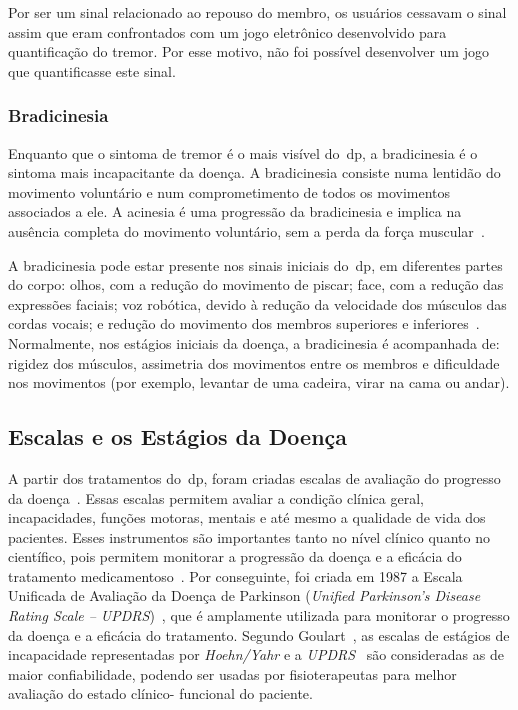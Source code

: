 Por ser um sinal relacionado ao repouso do membro, os usuários cessavam o sinal assim que eram confrontados com um jogo eletrônico desenvolvido para quantificação do tremor. Por esse motivo, não foi possível desenvolver um jogo que quantificasse este sinal.


\subsubsection{Bradicinesia}\label{section:analise_bradicinesia}
Enquanto que o sintoma de tremor é o mais visível do~\ac{dp}, a bradicinesia é o sintoma mais incapacitante da doença. A bradicinesia consiste numa lentidão do movimento voluntário e num comprometimento de todos os movimentos associados a ele. A acinesia é uma progressão da bradicinesia e implica na ausência completa do movimento voluntário, sem a perda da força muscular~\cite{do2007parkinson}.

A bradicinesia pode estar presente nos sinais iniciais do~\ac{dp}, em diferentes partes do corpo: olhos, com a redução do movimento de piscar; face, com a redução das expressões faciais; voz robótica, devido à redução da velocidade dos músculos das cordas vocais; e redução do movimento dos membros superiores e inferiores~\cite{do2007parkinson}. Normalmente, nos estágios iniciais da doença, a bradicinesia é acompanhada de: rigidez dos músculos, assimetria dos movimentos entre os membros e dificuldade nos movimentos (por exemplo, levantar de uma cadeira, virar na cama ou andar).  

\subsection{Escalas e os Estágios da Doença}\label{section:escalas_avaliacao}
A partir dos tratamentos do~\ac{dp}, foram criadas escalas de avaliação do progresso da doença~\cite{updrs87,goul05}. Essas escalas permitem avaliar a condição clínica geral, incapacidades, funções motoras, mentais e até mesmo a qualidade de vida dos pacientes. Esses instrumentos são importantes tanto no nível clínico quanto no científico, pois permitem monitorar a progressão da doença e a eficácia do tratamento medicamentoso~\cite{updrs87,goul05}.  Por conseguinte, foi criada em 1987 a Escala Unificada de Avaliação da  Doença de Parkinson (\textit{Unified Parkinson’s Disease Rating Scale – UPDRS})~\cite{updrs87}, que é amplamente utilizada para monitorar o progresso da doença e a eficácia do tratamento. Segundo Goulart~\cite{goul05}, as escalas de estágios de incapacidade representadas por \textit{Hoehn/Yahr} e a \textit{UPDRS}~\cite{updrs87} são consideradas as de maior confiabilidade, podendo ser usadas por fisioterapeutas para melhor avaliação do estado clínico-
funcional do  paciente.%


